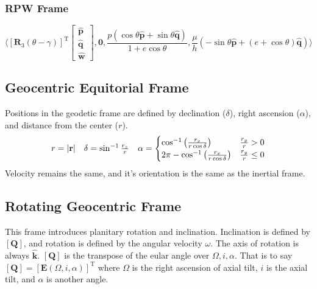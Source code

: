 \subsubsection{RPW Frame}
\begin{equation}
    \label{perifocal_rpw}
    \langle
    \left[\mathbf{R}_{3}\left(\theta-\gamma\right)\right]^{\mathrm{T}}
    \begin{bmatrix}
        \hat{\mathbf{p}} \\
        \hat{\mathbf{q}} \\
        \hat{\mathbf{w}}
    \end{bmatrix},
    \mathbf{0},
    \frac{p\left(\cos{\theta}\hat{\mathbf{p}} + \sin{\theta}\hat{\mathbf{q}}\right)}{1+e\cos{\theta}},
    \frac{\mu}{h}\left(-\sin{\theta}\hat{\mathbf{p}} + \left(e+\cos{\theta}\right)\hat{\mathbf{q}}\right)
    \rangle
\end{equation}

\subsection{Geocentric Equitorial Frame}
Positions in the geodetic frame are defined by declination ($\delta$), right ascension ($\alpha$), and distance from the center ($r$).
\begin{equation}
    \begin{array}{c c c}
        r = |\mathbf{r}| &
        \delta = \sin^{-1}{\frac{r_z}{r}} &
        \alpha =
        \begin{cases}
            \cos^{-1}{\left(\frac{r_x}{r\cos{\delta}}\right)} & \frac{r_y}{r} > 0 \\
            2\pi-\cos^{-1}{\left(\frac{r_x}{r\cos{\delta}}\right)} & \frac{r_y}{r} \leq 0
        \end{cases}
    \end{array}
\end{equation}
Velocity remains the same, and it's orientation is the same as the inertial frame.

\subsection{Rotating Geocentric Frame}
This frame introduces planitary rotation and inclination. Inclination is defined by $\left[\mathbf{Q}\right]$, and rotation
is defined by the angular velocity $\omega$. The axis of rotation is always $\hat{\mathbf{k}}$.
$\left[\mathbf{Q}\right]$ is the transpose of the eular angle over $\Omega,i,\alpha$.
That is to say $\left[\mathbf{Q}\right]=\left[\mathbf{E}\left(\Omega,i,\alpha\right)\right]^{\mathrm{T}}$ where $\Omega$ is
the right ascension of axial tilt, $i$ is the axial tilt, and $\alpha$ is another angle. %

